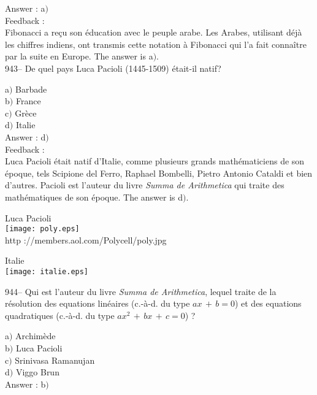 ﻿\documentclass[letterpaper, 12pt]{article}
\begin{document}
Answer : a$)$\\

Feedback : \\
Fibonacci a re\c cu son \'education avec le peuple arabe. Les
Arabes, utilisant d\'ej\`a les chiffres indiens, ont transmis
cette notation \`a Fibonacci qui l'a fait conna\^itre par la suite en
Europe. The answer is a$)$.\\

943-- De quel pays Luca Pacioli (1445-1509) \'etait-il natif?

a$)$ Barbade \\
b$)$ France  \\
c$)$ Gr\`ece \\
d$)$ Italie \\

Answer : d$)$\\

Feedback :\\
Luca Pacioli \'etait natif d'Italie, comme plusieurs grands
math\'ematiciens de son \'epoque, tels Scipione del Ferro, Raphael
Bombelli, Pietro Antonio Cataldi et bien d'autres. Pacioli
est l'auteur du livre {\sl Summa de Arithmetica} qui traite des
math\'ematiques de son \'epoque. The answer is d$)$.\\

        \begin{center}
        Luca Pacioli\\
    \texttt{[image: poly.eps]}\\
        {\footnotesize http ://members.aol.com/Polycell/poly.jpg}
    \end{center}

        \begin{center}
        Italie\\
    \texttt{[image: italie.eps]}\\
    \end{center}

944-- Qui est l'auteur du livre {\sl Summa de Arithmetica}, lequel
traite de la r\'esolution des equations lin\'eaires (c.-\`a-d. du
type $ax\,+\,b=0$) et des equations quadratiques (c.-\`a-d. du
type $ax^2\,+\,bx\,+\,c=0$) ?

a$)$ Archim\`ede \\
b$)$ Luca Pacioli  \\
c$)$ Srinivasa Ramanujan \\
d$)$ Viggo Brun \\

Answer : b$)$\\
\end{document}

